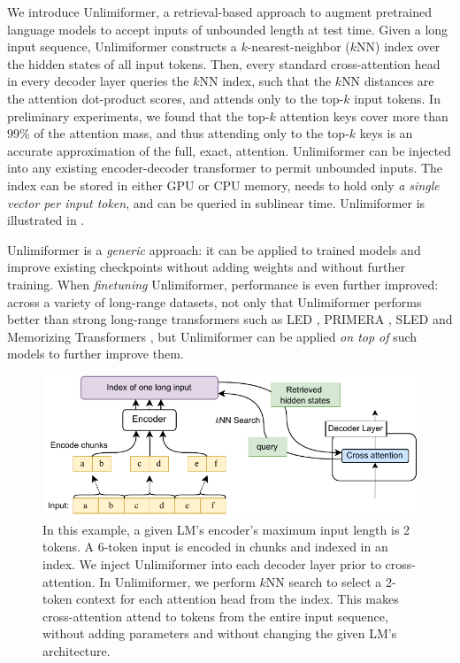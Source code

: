 \documentclass{article}
\newcommand{\ours}{Unlimiformer\xspace}
\begin{document}
We introduce \ours{}, a retrieval-based approach to augment pretrained language models to accept inputs of unbounded length at test time. 
Given a long input sequence,
\ours constructs a $k$-nearest-neighbor ($k$NN) index over the hidden states of all input tokens. 
Then, every  standard cross-attention head in every decoder layer queries the $k$NN index, 
such that the $k$NN distances are the attention dot-product scores, 
and attends only to the top-$k$ input tokens.
In preliminary experiments, we found that 
the top-$k$ attention keys cover more than 99\% of the attention mass, and thus attending only to the top-$k$ keys is an accurate approximation of the full, exact, attention. 
\ours can be injected into any existing encoder-decoder transformer to permit unbounded inputs.
The index can be stored in either GPU or CPU memory,
needs to hold only \emph{a single vector per input token}, 
and can be queried in  sublinear time. 
\ours is illustrated in .

\ours is a \emph{generic} approach: it can be applied to trained models and improve existing checkpoints without adding weights and without further training.
When \emph{finetuning} \ours, performance is even further improved: %
across a variety of long-range datasets,
not only that \ours performs better 
than strong long-range transformers such as LED \citep{beltagy2020longformer}, PRIMERA \citep{xiao-etal-2022-primera}, SLED \citep{sled} and Memorizing Transformers \citep{memtrans}, but  \ours can be applied \emph{on top of} such models to further improve them. 




\begin{figure}[t]
\centering
    \includegraphics[]{figures/unlimformer_diagram3.pdf}
    \caption{In this example, a given LM's encoder's maximum input length is 2 tokens. A 6-token input is encoded in chunks and indexed in an index. We inject \ours into each decoder layer prior to cross-attention. In \ours, we perform $k$NN search to select a 2-token context for each attention head from the index. This makes cross-attention attend to tokens
    from the entire input sequence, without adding parameters and without changing the given LM's architecture.}
    \label{fig:model-diagram}
\end{figure}
\end{document}

